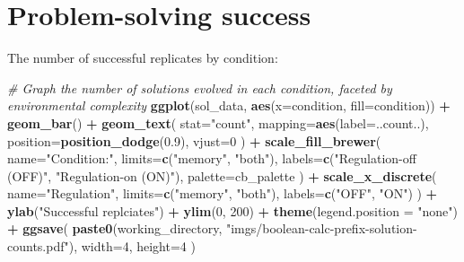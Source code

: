 \documentclass[]{book}
\newenvironment{Shaded}{\begin{snugshade}}{\end{snugshade}}
\newcommand{\CommentTok}[1]{\textcolor[rgb]{0.56,0.35,0.01}{\textit{#1}}}
\newcommand{\DataTypeTok}[1]{\textcolor[rgb]{0.13,0.29,0.53}{#1}}
\newcommand{\DecValTok}[1]{\textcolor[rgb]{0.00,0.00,0.81}{#1}}
\newcommand{\FloatTok}[1]{\textcolor[rgb]{0.00,0.00,0.81}{#1}}
\newcommand{\KeywordTok}[1]{\textcolor[rgb]{0.13,0.29,0.53}{\textbf{#1}}}
\newcommand{\NormalTok}[1]{#1}
\newcommand{\OperatorTok}[1]{\textcolor[rgb]{0.81,0.36,0.00}{\textbf{#1}}}
\newcommand{\StringTok}[1]{\textcolor[rgb]{0.31,0.60,0.02}{#1}}
\begin{document}
\hypertarget{problem-solving-success-2}{%
\section{Problem-solving success}\label{problem-solving-success-2}}

The number of successful replicates by condition:

\begin{Shaded}
\begin{Highlighting}[]
\CommentTok{# Graph the number of solutions evolved in each condition, faceted by environmental complexity}
\KeywordTok{ggplot}\NormalTok{(sol_data, }\KeywordTok{aes}\NormalTok{(}\DataTypeTok{x=}\NormalTok{condition, }\DataTypeTok{fill=}\NormalTok{condition)) }\OperatorTok{+}
\StringTok{  }\KeywordTok{geom_bar}\NormalTok{() }\OperatorTok{+}
\StringTok{  }\KeywordTok{geom_text}\NormalTok{(}
    \DataTypeTok{stat=}\StringTok{"count"}\NormalTok{,}
    \DataTypeTok{mapping=}\KeywordTok{aes}\NormalTok{(}\DataTypeTok{label=}\NormalTok{..count..),}
    \DataTypeTok{position=}\KeywordTok{position_dodge}\NormalTok{(}\FloatTok{0.9}\NormalTok{),}
    \DataTypeTok{vjust=}\DecValTok{0}
\NormalTok{  ) }\OperatorTok{+}
\StringTok{  }\KeywordTok{scale_fill_brewer}\NormalTok{(}
    \DataTypeTok{name=}\StringTok{"Condition:"}\NormalTok{,}
    \DataTypeTok{limits=}\KeywordTok{c}\NormalTok{(}\StringTok{"memory"}\NormalTok{, }\StringTok{"both"}\NormalTok{),}
    \DataTypeTok{labels=}\KeywordTok{c}\NormalTok{(}\StringTok{"Regulation-off (OFF)"}\NormalTok{, }\StringTok{"Regulation-on (ON)"}\NormalTok{),}
    \DataTypeTok{palette=}\NormalTok{cb_palette}
\NormalTok{  ) }\OperatorTok{+}
\StringTok{  }\KeywordTok{scale_x_discrete}\NormalTok{(}
    \DataTypeTok{name=}\StringTok{"Regulation"}\NormalTok{,}
    \DataTypeTok{limits=}\KeywordTok{c}\NormalTok{(}\StringTok{"memory"}\NormalTok{, }\StringTok{"both"}\NormalTok{),}
    \DataTypeTok{labels=}\KeywordTok{c}\NormalTok{(}\StringTok{"OFF"}\NormalTok{, }\StringTok{"ON"}\NormalTok{)}
\NormalTok{  ) }\OperatorTok{+}
\StringTok{  }\KeywordTok{ylab}\NormalTok{(}\StringTok{"Successful replciates"}\NormalTok{) }\OperatorTok{+}
\StringTok{  }\KeywordTok{ylim}\NormalTok{(}\DecValTok{0}\NormalTok{, }\DecValTok{200}\NormalTok{) }\OperatorTok{+}
\StringTok{  }\KeywordTok{theme}\NormalTok{(}\DataTypeTok{legend.position =} \StringTok{"none"}\NormalTok{) }\OperatorTok{+}
\StringTok{  }\KeywordTok{ggsave}\NormalTok{(}
    \KeywordTok{paste0}\NormalTok{(working_directory, }\StringTok{"imgs/boolean-calc-prefix-solution-counts.pdf"}\NormalTok{),}
    \DataTypeTok{width=}\DecValTok{4}\NormalTok{,}
    \DataTypeTok{height=}\DecValTok{4}
\NormalTok{  )}
\end{Highlighting}
\end{Shaded}
\end{document}
